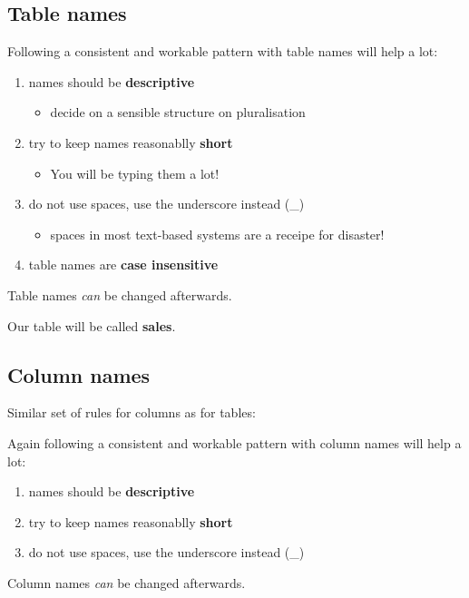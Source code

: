 \documentclass[slides]{pgnotes}
\begin{document}
\subsection{Table names}

Following a consistent and workable pattern with table names will help a lot:

\begin{enumerate}
\item names should be \textbf{descriptive}
  \begin{itemize}
  \item decide on a sensible structure on pluralisation
  \end{itemize}
\item try to keep names reasonablly \textbf{short}
  \begin{itemize}
  \item You will be typing them a lot!
  \end{itemize}
\item do not use spaces, use the underscore instead (\_)
  \begin{itemize}
  \item spaces in most text-based systems are a receipe for disaster!
  \end{itemize}
\item table names are \textbf{case insensitive}
\end{enumerate}

Table names \textit{can} be changed afterwards.

Our table will be called \textbf{sales}.


\subsection{Column names}

Similar set of rules for columns as for tables:

Again following a consistent and workable pattern with column names will help a lot:

\begin{enumerate}
\item names should be \textbf{descriptive}
\item try to keep names reasonablly \textbf{short}
\item do not use spaces, use the underscore instead (\_)
\end{enumerate}

Column names \textit{can} be changed afterwards.
\end{document}
